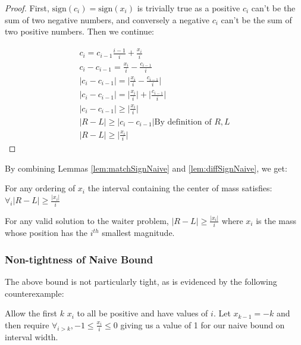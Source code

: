 \documentclass[11pt,twocolumn]{article}
\begin{document}
\begin{proof}
First, $\textrm{sign}(c_i) = \textrm{sign}(x_i)$  is trivially true as a positive $c_i$ can't be the sum of two negative numbers, and conversely a negative $c_i$ can't be the sum of two positive numbers.  Then we continue:

\begin{eqnarray*}
c_i = c_{i-1}\frac{i-1}{i} + \frac{x_i }{ i } \\ 
c_i - c_{i-1} = \frac{x_i}{i} - \frac{c_{i-1}}{i} \\
\big|c_i - c_{i-1}\big| = \big|\frac{x_i}{i} - \frac{c_{i-1}}{i}\big| \\
\big|c_i - c_{i-1}\big| = \big|\frac{x_i}{i}\big| + \big|\frac{c_{i-1}}{i}\big| \\
\big|c_i - c_{i-1}\big| \geq \big|\frac{x_i}{i}\big|  \\
\big|R-L\big| \geq \big|c_i - c_{i-1}\big| \textrm{By definition of } R,L \\
\big|R-L\big| \geq \big|\frac{x_i }{ i }\big|
\end{eqnarray*}

\end{proof}

By combining Lemmas \ref{lem:matchSignNaive} and \ref{lem:diffSignNaive}, we get:

\begin{thm} \label{thm:naiveBound}
For any ordering of $x_i$ the interval containing the center of mass satisfies: $\forall_i \big|R-L\big| \geq \frac{\big|x_i\big|}{i} $
\end{thm}

\begin{cor} \label{cor:naiveBound}
For any valid solution to the waiter problem, $|R-L| \geq \frac{|x_i|}{i}$ where $x_i$ is the mass whose position has the $i^{th}$ smallest magnitude.
\end{cor}

\subsubsection{Non-tightness of Naive Bound} \label{subs:naiveCounter}

The above bound is not particularly tight, as is evidenced by the following counterexample:

Allow the first $k$ $x_i$ to all be positive and have values of $i$.  Let $ x_{k-1} = -k $ and then require $ \forall_{ i > k}, -1 \leq \frac{x_i}{i} \leq 0 $ giving us a value of 1 for our naive bound on interval width.
\end{document}
